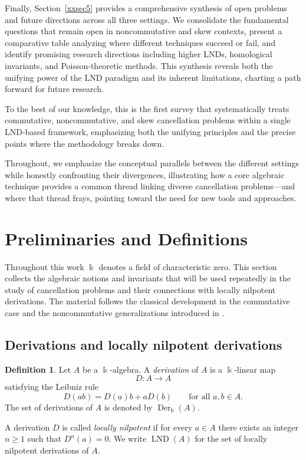 \documentclass{amsart}
\theoremstyle{plain}
\numberwithin{theorem}{section}
\numberwithin{equation}{theorem}
\theoremstyle{definition}
\newtheorem{definition}[theorem]{Definition}
\DeclareMathOperator{\LND}{LND}
\DeclareMathOperator{\Der}{Der}
\begin{document}
Finally, Section~\ref{xxsec5} provides a comprehensive synthesis of open problems 
and future directions across all three settings. We consolidate the fundamental 
questions that remain open in noncommutative and skew contexts, present a 
comparative table analyzing where different techniques succeed or fail, and 
identify promising research directions including higher LNDs, homological 
invariants, and Poisson-theoretic methods. This synthesis reveals both the unifying 
power of the LND paradigm and its inherent limitations, charting a path forward 
for future research.


To the best of our knowledge, this is the first survey that systematically treats
commutative, noncommutative, and skew cancellation problems within a single
LND-based framework, emphasizing both the unifying principles and the precise
points where the methodology breaks down.



Throughout, we emphasize the conceptual parallels between the different settings 
while honestly confronting their divergences, illustrating how a core algebraic 
technique provides a common thread linking diverse cancellation problems—and where 
that thread frays, pointing toward the need for new tools and approaches.





\section{Preliminaries and Definitions}
\label{xxsec1}

Throughout this work $\Bbbk$ denotes a field of characteristic zero.  
This section collects the algebraic notions and invariants that will be used repeatedly in the study of cancellation problems and their connections with locally nilpotent derivations.  
The material follows the classical development in the commutative case \cite{Freudenburg2006, ML} and the noncommutative generalizations introduced in \cite{BellZhang2017}.

\subsection{Derivations and locally nilpotent derivations}

\begin{definition}
Let $A$ be a $\Bbbk$-algebra. A \emph{derivation} of $A$ is a $\Bbbk$-linear map
\[
D:A\to A
\]
satisfying the Leibniz rule
\[
D(ab)=D(a)b+aD(b)\qquad \text{for all }a,b\in A.
\]
The set of derivations of $A$ is denoted by $\Der_{\Bbbk}(A)$.

A derivation $D$ is called \emph{locally nilpotent} if for every $a\in A$ there exists an integer $n\ge 1$ such that $D^n(a)=0$.  
We write $\LND(A)$ for the set of locally nilpotent derivations of $A$.
\end{definition}
\end{document}

